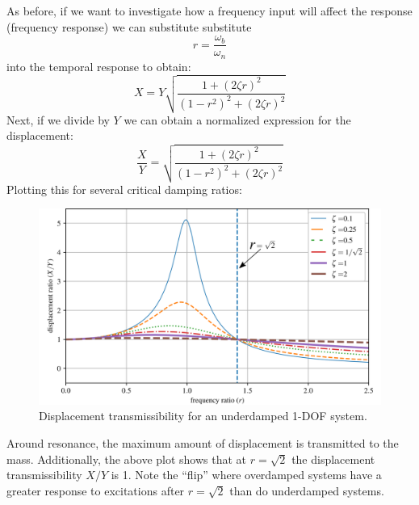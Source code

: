 \documentclass[12pt,letter]{article}
\numberwithin{ex}{section} %
\numberwithin{re}{section} %
\numberwithin{vcs}{section} %
\begin{document}
				As before, if we want to investigate how a frequency input will affect the response (frequency response) we can substitute substitute 
				\begin{equation}
				r=\frac{\omega_b}{\omega_n}
				\end{equation} 
				into the temporal response to obtain:
				\begin{equation}
				X = Y \sqrt{\frac{1+(2 \zeta r)^2}{(1-r^2)^2 + (2 \zeta r )^2}} 
				\end{equation} 
				Next, if we divide by $Y$ we can obtain a normalized expression for the displacement:
				\begin{equation}
				\frac{X}{Y} = \sqrt{\frac{1+(2 \zeta r)^2}{(1-r^2)^2 + (2 \zeta r )^2}} 
				\end{equation} 
				Plotting this for several critical damping ratios:
				\begin{figure}[H]
					\centering
					\includegraphics[]{../figures/base_excitation_displacement_transmissibility}
					\caption{Displacement transmissibility for an underdamped 1-DOF system.}
				\end{figure}
				Around resonance, the maximum amount of displacement is transmitted to the mass. Additionally,  the above plot shows that at $r=\sqrt{2}$ the displacement transmissibility $X/Y$ is 1. Note the ``flip'' where overdamped systems have a greater response to excitations after $r=\sqrt{2}$ than do underdamped systems.
\end{document}
